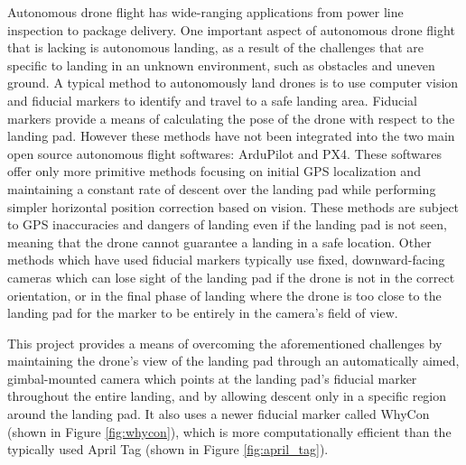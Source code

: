 Autonomous drone flight has wide-ranging applications from power line inspection to package delivery. One important aspect of autonomous drone flight that is lacking is autonomous landing, as a result of the challenges that are specific to landing in an unknown environment, such as obstacles and uneven ground. A typical method to autonomously land drones is to use computer vision and fiducial markers to identify and travel to a safe landing area.\cite{visual_servoing}\cite{high_velocity_landing}\cite{vision_based_x_platform} Fiducial markers provide a means of calculating the pose of the drone with respect to the landing pad. However these methods have not been integrated into the two main open source autonomous flight softwares: ArduPilot and PX4. These softwares offer only more primitive methods focusing on initial GPS localization and maintaining a constant rate of descent over the landing pad while performing simpler horizontal position correction based on vision. These methods are subject to GPS inaccuracies and dangers of landing even if the landing pad is not seen, meaning that the drone cannot guarantee a landing in a safe location. Other methods which have used fiducial markers typically use fixed, downward-facing cameras which can lose sight of the landing pad if the drone is not in the correct orientation, or in the final phase of landing where the drone is too close to the landing pad for the marker to be entirely in the camera's field of view.

This project provides a means of overcoming the aforementioned challenges by maintaining the drone's view of the landing pad through an automatically aimed, gimbal-mounted camera which points at the landing pad's fiducial marker throughout the entire landing, and by allowing descent only in a specific region around the landing pad. It also uses a newer fiducial marker called WhyCon \cite{whycon_paper} (shown in Figure \ref{fig:whycon}), which is more computationally efficient than the typically used April Tag \cite{apriltag_paper} (shown in Figure \ref{fig:april_tag}).

